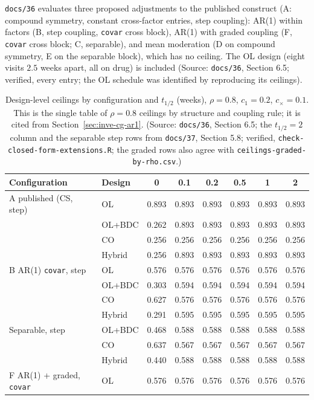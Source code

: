 \documentclass[11pt]{article}
\newcommand{\code}[1]{\texttt{#1}}
\begin{document}
\code{docs/36} evaluates three proposed adjustments to the published
construct (A: compound symmetry, constant cross-factor entries, step
coupling): AR(1) within factors (B, step coupling, \code{covar} cross
block), AR(1) with graded coupling (F, \code{covar} cross block; C,
separable), and mean moderation (D on compound symmetry, E on the
separable block), which has no ceiling. The OL design (eight visits
$2.5$ weeks apart, all on drug) is included (Source: \code{docs/36},
Section 6.5; verified, every entry; the OL schedule was identified by
reproducing its ceilings).

\begin{table}[h]
\centering\small
\caption{Design-level ceilings by configuration and $t_{1/2}$ (weeks),
$\rho = 0.8$, $c_1 = 0.2$, $c_\times = 0.1$. This is the single table of
$\rho = 0.8$ ceilings by structure and coupling rule; it is cited from
Section~\ref{sec:inve-cg-ar1}. (Source: \code{docs/36}, Section 6.5;
the $t_{1/2} = 2$ column and the separable step rows from
\code{docs/37}, Section 5.8; verified, \code{check-closed-form-extensions.R}; the
graded rows also agree with \code{ceilings-graded-by-rho.csv}.)}
\label{tab:inve-config}
\begin{tabular}{@{}llcccccc@{}}
\toprule
Configuration & Design & 0 & 0.1 & 0.2 & 0.5 & 1 & 2 \\
\midrule
A published (CS, step) & OL & 0.893 & 0.893 & 0.893 & 0.893 & 0.893 & 0.893 \\
 & OL+BDC & 0.262 & 0.893 & 0.893 & 0.893 & 0.893 & 0.893 \\
 & CO & 0.256 & 0.256 & 0.256 & 0.256 & 0.256 & 0.256 \\
 & Hybrid & 0.256 & 0.893 & 0.893 & 0.893 & 0.893 & 0.893 \\
B AR(1) \code{covar}, step & OL & 0.576 & 0.576 & 0.576 & 0.576 & 0.576 & 0.576 \\
 & OL+BDC & 0.303 & 0.594 & 0.594 & 0.594 & 0.594 & 0.594 \\
 & CO & 0.627 & 0.576 & 0.576 & 0.576 & 0.576 & 0.576 \\
 & Hybrid & 0.291 & 0.595 & 0.595 & 0.595 & 0.595 & 0.595 \\
Separable, step & OL+BDC & 0.468 & 0.588 & 0.588 & 0.588 & 0.588 & 0.588 \\
 & CO & 0.637 & 0.567 & 0.567 & 0.567 & 0.567 & 0.567 \\
 & Hybrid & 0.440 & 0.588 & 0.588 & 0.588 & 0.588 & 0.588 \\
F AR(1) + graded, \code{covar} & OL & 0.576 & 0.576 & 0.576 & 0.576 & 0.576 & 0.576 \\

\end{tabular}
\end{table}
\end{document}
